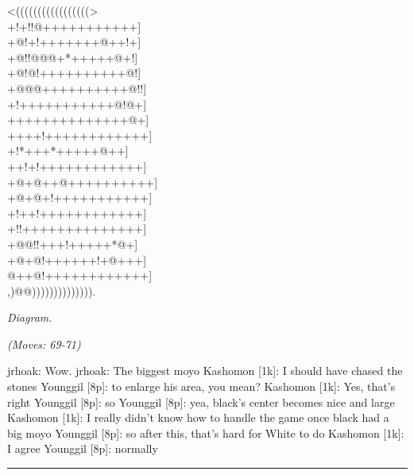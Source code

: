 \documentclass[letterpaper,12pt]{memoir}
\newcounter{GoFigure}[part]
\newcommand{\gofigure}{%
 \stepcounter{GoFigure}
 \centerline{\textit{Diagram.\thinspace\arabic{GoFigure}}}
}
\newcommand{\subtext}[1]{\centerline{\textit{#1}}}
\begin{document}
\begin{minipage}[t]{0.5\textwidth}
{\gnos
<(((((((((((((((((>\\
+!+!!@+++++++++++]\\
+@!+!+++++++@++!+]\\
+@!!@@@+*+++++@+!]\\
+@!@!++++++++++@!]\\
+@@@++++++++++@!!]\\
+!+++++++++++@!@+]\\
++++++++++++++@+]\\
++++!++++++++++++]\\
+!*+++*+++++@++]\\
++!+!++++++++++++]\\
+@+@++@++++++++++]\\
+@+@+!+++++++++++]\\
+!++!++++++++++++]\\
+!!++++++++++++++]\\
+@@!!+++!+++++*@+]\\
+@+@!++++++!+@+++]\\
@++@!++++++++++++]\\
,)@@)))))))))))))).\\
}
\gofigure

\subtext{(Moves: 69-71)}
\end{minipage}
\begin{minipage}[t]{0.5\textwidth}
\setlength{\parskip}{0.5em}
jrhoak: Wow.
jrhoak: The biggest moyo
Kashomon [1k]: I should have chased the stones
Younggil [8p]: to enlarge his area, you mean?
Kashomon [1k]: Yes, that's right
Younggil [8p]: so
Younggil [8p]: yea, black's center becomes nice and large
Kashomon [1k]: I really didn't know how to handle the game once black had a big moyo
Younggil [8p]: so after this, that's hard for White to do
Kashomon [1k]: I agree
Younggil [8p]: normally


\end{minipage}
\vfill

\rule{\textwidth}{0.5pt}
\end{document}
